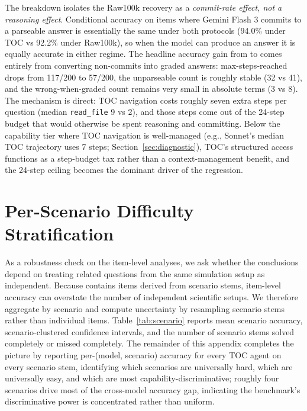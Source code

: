\documentclass{article}
\begin{document}
The breakdown isolates the Raw100k recovery as a \emph{commit-rate effect, not a reasoning effect}. Conditional accuracy on items where Gemini Flash 3 commits to a parseable answer is essentially the same under both protocols (94.0\% under TOC vs 92.2\% under Raw100k), so when the model can produce an answer it is equally accurate in either regime. The headline accuracy gain from \GeminiThreeFlashTOC{} to \GeminiThreeFlashRaw{} comes entirely from converting non-commits into graded answers: max-steps-reached drops from 117/200 to 57/200, the unparseable count is roughly stable (32 vs 41), and the wrong-when-graded count remains very small in absolute terms (3 vs 8). The mechanism is direct: TOC navigation costs roughly seven extra steps per question (median \texttt{read\_file} 9 vs 2), and those steps come out of the 24-step budget that would otherwise be spent reasoning and committing. Below the capability tier where TOC navigation is well-managed (e.g., Sonnet's median TOC trajectory uses 7 steps; Section~\ref{sec:diagnostic}), TOC's structured access functions as a step-budget tax rather than a context-management benefit, and the 24-step ceiling becomes the dominant driver of the regression.

\section{Per-Scenario Difficulty Stratification}
\label{sec:appendix-scenario-stratification}

As a robustness check on the item-level analyses, we ask whether the conclusions depend on treating related questions from the same simulation setup as independent. Because \BenchName{} contains \BenchN{} items derived from \BenchScenarioN{} scenario stems, item-level accuracy can overstate the number of independent scientific setups. We therefore aggregate by scenario and compute uncertainty by resampling scenario stems rather than individual items. Table~\ref{tab:scenario} reports mean scenario accuracy, scenario-clustered confidence intervals, and the number of scenario stems solved completely or missed completely. The remainder of this appendix completes the picture by reporting per-(model, scenario) accuracy for every TOC agent on every scenario stem, identifying which scenarios are universally hard, which are universally easy, and which are most capability-discriminative; roughly four scenarios drive most of the cross-model accuracy gap, indicating the benchmark's discriminative power is concentrated rather than uniform.
\end{document}

